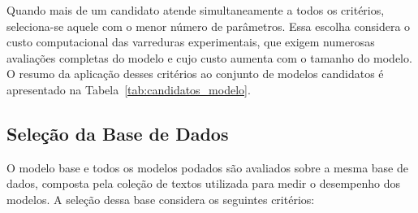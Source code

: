 Quando mais de um candidato atende simultaneamente a todos os critérios, seleciona-se
aquele com o menor número de parâmetros. Essa escolha considera o custo computacional das
varreduras experimentais, que exigem numerosas
avaliações completas do modelo e cujo custo aumenta com o tamanho do modelo. O resumo da
aplicação desses critérios ao conjunto de modelos candidatos é apresentado na
Tabela~\ref{tab:candidatos_modelo}.



\subsection{Seleção da Base de Dados}\label{subsec:metodologia_base}

O modelo base e todos os modelos podados são avaliados sobre a mesma base de dados, composta
pela coleção de textos utilizada para medir o desempenho dos modelos. A seleção dessa base
considera os seguintes critérios:

